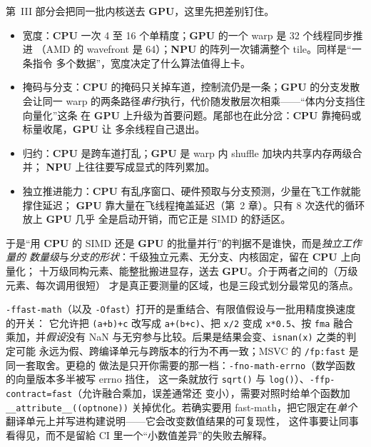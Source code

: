 \documentclass[12pt,a4paper,fontset=fandol]{ctexbook}
\newcommand{\Fn}[1]{\texttt{#1()}}
\newcommand{\Tp}[1]{\texttt{#1}}
\newcommand{\Dom}[1]{\textsf{\bfseries #1}}
\newcommand{\CPU}{\Dom{CPU}}
\newcommand{\GPU}{\Dom{GPU}}
\newcommand{\NPU}{\Dom{NPU}}
\begin{document}
第~III 部分会把同一批内核送去 \GPU{}，这里先把差别钉住。
\begin{itemize}
  \item 宽度：\CPU{} 一次 4 至 16 个单精度；\GPU{} 的一个 warp 是 32 个线程同步推进
        （AMD 的 wavefront 是 64）；\NPU{} 的阵列一次铺满整个 tile。同样是``一条指令
        多个数据''，宽度决定了什么算法值得上卡。
  \item 掩码与分支：\CPU{} 的掩码只关掉车道，控制流仍是一条；\GPU{} 的分支发散会让同一
        warp 的两条路径\emph{串行}执行，代价随发散层次相乘——``体内分支挡住向量化''这条
        在 \GPU{} 上升级为首要问题。尾部也在此分岔：\CPU{} 靠掩码或标量收尾，\GPU{} 让
        多余线程自己退出。
  \item 归约：\CPU{} 是跨车道打乱；\GPU{} 是 warp 内 shuffle 加块内共享内存两级合并；
        \NPU{} 上往往要写成显式的阵列累加。
  \item 独立推进能力：\CPU{} 有乱序窗口、硬件预取与分支预测，少量在飞工作就能撑住延迟；
        \GPU{} 靠大量在飞线程掩盖延迟（第~2 章）。只有 8 次迭代的循环放上 \GPU{} 几乎
        全是启动开销，而它正是 SIMD 的舒适区。
\end{itemize}
于是``用 \CPU{} 的 SIMD 还是 \GPU{} 的批量并行''的判据不是谁快，而是\emph{独立工作量的
数量级}与\emph{分支的形状}：千级独立元素、无分支、内核固定，留在 \CPU{} 上向量化；
十万级同构元素、能整批搬进显存，送去 \GPU{}。介于两者之间的（万级元素、每次调用很短）
才是真正要测量的区域，也是三段式划分最常见的落点。

\begin{warning}[title={-ffast-math 改变的不只是速度}]
\Tp{-ffast-math}（以及 \Tp{-Ofast}）打开的是重结合、有限值假设与一批用精度换速度的开关：
它允许把 \Tp{(a+b)+c} 改写成 \Tp{a+(b+c)}、把 \Tp{x/2} 变成 \Tp{x*0.5}、按 \Tp{fma} 融合
乘加，并\emph{假设}没有 NaN 与无穷参与比较。后果是结果会变、\Tp{isnan(x)} 之类的判定可能
永远为假、跨编译单元与跨版本的行为不再一致；MSVC 的 \Tp{/fp:fast} 是同一套取舍。更稳的
做法是只开你需要的那一档：\Tp{-fno-math-errno}（数学函数的向量版本多半被写 errno 挡住，
这一条就放行 \Fn{sqrt} 与 \Fn{log}）、\Tp{-ffp-contract=fast}（允许融合乘加，误差通常还
变小），需要对照时给单个函数加 \Tp{\_\_attribute\_\_((optnone))} 关掉优化。若确实要用
fast-math，把它限定在\emph{单个}翻译单元上并写进构建说明——它会改变数值结果的可复现性，
这件事要让同事看得见，而不是留給 CI 里一个``小数值差异''的失败去解释。
\end{warning}
\end{document}
